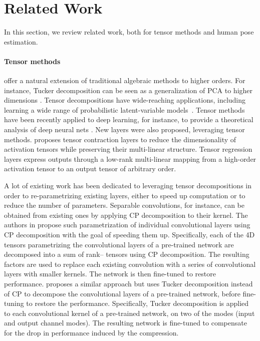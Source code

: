 \documentclass[10pt,twocolumn,letterpaper]{article}
\begin{document}
\section{Related Work}

In this section, we review related work, both for tensor methods and human pose estimation. 

\paragraph{Tensor methods} offer a natural extension of traditional algebraic methods to higher orders. For instance, Tucker decomposition can be seen as a generalization of PCA to higher dimensions \cite{tensor_decomposition_kolda}. Tensor decompositions have wide-reaching applications, including learning a wide range of probabilistic latent-variable models~\cite{decomposition_latent_anandkumar}.
Tensor methods have been recently applied to deep learning, for instance, to provide a theoretical analysis of deep neural nets \cite{expressive_deep_tensor}. New layers were also proposed, leveraging tensor methods. \cite{kossaifi2017tensor} proposes tensor contraction layers to reduce the dimensionality of activation tensors while preserving their multi-linear structure. Tensor regression layers  \cite{kossaifi2018tensor} express outputs through a low-rank multi-linear mapping from a high-order activation tensor to an output tensor of arbitrary order.

A lot of existing work has been dedicated to leveraging tensor decompositions in order to re-parametrizing existing layers, either to speed up computation or to reduce the number of parameters. Separable convolutions, for instance, can be obtained from existing ones by applying CP decomposition to their kernel. The authors in \cite{lebedev2014speeding} propose such parametrization of individual convolutional layers using CP decomposition with the goal of speeding them up. Specifically, each of the 4D tensors parametrizing the convolutional layers of a pre-trained network are decomposed into a sum of rank-- tensors using CP decomposition. The resulting factors are used to replace each existing convolution with a series of  convolutional layers with smaller kernels. The network is then fine-tuned to restore performance. 
\cite{yong2015compression} proposes a similar approach but uses Tucker decomposition instead of CP to decompose the convolutional layers of a pre-trained network, before fine-tuning to restore the performance. Specifically, Tucker decomposition is applied to each convolutional kernel of a pre-trained network, on two of the modes (input and output channel modes). The resulting network is fine-tuned to compensate for the drop in performance induced by the compression.
\end{document}
